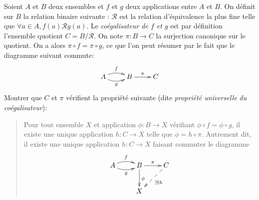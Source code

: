 \begin{exercice}[Coégalisateur]
Soient $A$ et $B$ deux ensembles et $f$ et $g$ deux applications entre $A$ et $B$. On définit sur $B$ la relation binaire suivante : $\mathcal R$ est la relation d'équivalence la plus fine telle que $\forall a\in A, f(a)\mathcal R g(a)$. Le \emph{coégalisateur de $f$ et $g$} est par définition l'ensemble quotient $C = B/\mathcal R$. On note $\pi : B \to C$ la surjection canonique sur le quotient. On a alors $\pi\circ f = \pi \circ g$, ce que l'on peut résumer par le fait que le diagramme suivant commute:
\[
\xymatrix{
 A\ar@/^/[r] ^{f} \ar@/_/[r]_{g} & B \ar[r]^{\pi} & C
}
\]
Montrer que $C$ et $\pi$ vérifient la propriété suivante (dite \emph{propriété universelle du coégalisateur}):
\begin{quote}
Pour tout ensemble $X$ et application $\phi : B \to X$ vérifiant $\phi\circ f = \phi\circ g$,  il existe une unique application $h : C\to X$ telle que $\phi = h \circ \pi $. Autrement dit, il existe une unique application $h : C\to X$ faisant commuter le diagramme 
\[
\xymatrix{
 A\ar@/^/[r] ^{f} \ar@/_/[r]_{g} & B \ar[r]^{\pi} \ar[d]^{\phi}& C\ar@{-->}[dl]^{\exists!h}\\
 & X & 
}
\]
\end{quote}
\end{exercice}




